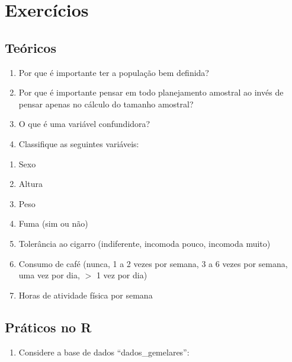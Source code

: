 \documentclass[
]{book}
\providecommand{\tightlist}{%
  \setlength{\itemsep}{0pt}\setlength{\parskip}{0pt}}
\begin{document}
\hypertarget{exercuxedcios}{%
\section{Exercícios}\label{exercuxedcios}}

\hypertarget{teuxf3ricos}{%
\subsection{Teóricos}\label{teuxf3ricos}}

\begin{enumerate}
\def\labelenumi{\arabic{enumi}.}
\item
  Por que é importante ter a população bem definida?
\item
  Por que é importante pensar em todo planejamento amostral ao
  invés de pensar apenas no cálculo do tamanho amostral?
\item
  O que é uma variável confundidora?
\item
  Classifique as seguintes variáveis:
\end{enumerate}

\begin{enumerate}
\def\labelenumi{\alph{enumi}.}
\item
  Sexo
\item
  Altura
\item
  Peso
\item
  Fuma (sim ou não)
\item
  Tolerância ao cigarro (indiferente, incomoda pouco, incomoda muito)
\item
  Consumo de café (nunca, 1 a 2 vezes por semana, 3 a 6 vezes por semana, uma vez por dia, \(>\) 1 vez por dia)
\item
  Horas de atividade física por semana
\end{enumerate}

\hypertarget{pruxe1ticos-no-r}{%
\subsection{Práticos no R}\label{pruxe1ticos-no-r}}

\begin{enumerate}
\def\labelenumi{\arabic{enumi}.}
\setcounter{enumi}{4}
\tightlist
\item
  Considere a base de dados ``dados\_gemelares'':
\end{enumerate}
\end{document}
